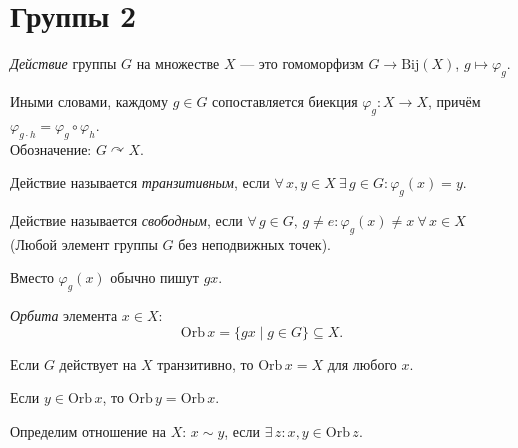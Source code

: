 \section{Группы 2}

\begin{definition}
    \emph{Действие} группы $G$ на множестве $X$ --- это гомоморфизм $G \to \mathrm{Bij}(X)$, $g \mapsto \varphi_g$.

    Иными словами, каждому $g \in G$ сопоставляется биекция $\varphi_g\colon X \to X$, причём $\varphi_{g \cdot h} = \varphi_g \circ \varphi_h$. \\
    Обозначение: $G \curvearrowright X$.
\end{definition}

\begin{definition}
    Действие называется \emph{транзитивным}, если $\forall\, x, y \in X\ \exists\, g \in G\colon \varphi_g(x) = y$.
\end{definition}

\begin{definition}
    Действие называется \emph{свободным}, если $\forall\, g \in G,\, g \neq e\colon \varphi_g(x) \neq x\ \forall\, x \in X$
    (Любой элемент группы $G$  без неподвижных точек).
\end{definition}


\begin{remark}
    Вместо $\varphi_g(x)$ обычно пишут $gx$.
\end{remark}



\begin{definition}
    \emph{Орбита} элемента $x \in X$:
    \[
        \mathrm{Orb}\, x = \{gx \mid g \in G\} \subseteq X.
    \]
\end{definition}

\begin{example}
    Если $G$ действует на $X$ транзитивно, то $\mathrm{Orb}\, x = X$ для любого $x$.
\end{example}

\begin{stmt}
    Если $y \in \mathrm{Orb}\, x$, то $\mathrm{Orb}\, y = \mathrm{Orb}\, x$.
\end{stmt}

\begin{definition}
    Определим отношение на $X$: $x \sim y$, если $\exists\, z\colon x, y \in \mathrm{Orb}\, z$.
\end{definition}

